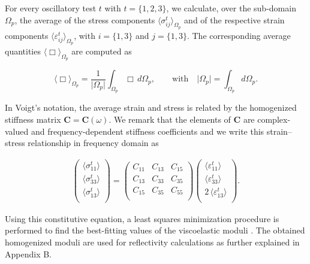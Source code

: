 \documentclass[draft]{agujournal2019}
\begin{document}
For every oscillatory test $t$ with $t = \{1,2,3\}$, we calculate, over the sub-domain $\Omega_p$, the average  of the stress components $\langle \sigma_{ij}^t \rangle_{\Omega_p}$ and of the respective strain components $\langle \varepsilon_{ij}^t \rangle_{\Omega_p}$, with $i=\{1,3\}$ and $j=\{1,3\}$. The corresponding average quantities $\langle \Box \rangle_{\Omega_p}$ are computed as
\begin{linenomath*}
\begin{equation}\label{Eq.12}
  \langle \Box \rangle_{\Omega_p} = \frac{1}{\vert \Omega_p \vert} \int_{\Omega_p} \Box \, d\Omega_p, \qquad \text{with} \quad  \vert \Omega_p \vert = \int_{\Omega_p}  d \Omega_p.
\end{equation}
\end{linenomath*}

In Voigt's notation, the average strain and stress is related by the homogenized stiffness matrix $\bm{C} = \bm{C} (\omega) $. We remark that the elements of $\bm{C}$  are  complex-valued and frequency-dependent stiffness coefficients and we write this strain--stress relationship in frequency domain as
\begin{linenomath*}
\begin{equation}\label{Eq.13}
 \begin{split}
 \begin{pmatrix}
 \langle \sigma_{11}^t\rangle \\
 \langle \sigma_{33}^t\rangle \\
  \langle\sigma_{13}^t\rangle \\
 \end{pmatrix}
 =
   \begin{pmatrix}
  C_{11} & C_{13} & C_{15} \\
  C_{13} & C_{33} & C_{35} \\
  C_{15} & C_{35} & C_{55}\\
 \end{pmatrix}
  \begin{pmatrix}
 \langle\varepsilon_{11}^t \rangle \\
 \langle \varepsilon_{33}^t \rangle \\
 2\, \langle \varepsilon_{13}^t \rangle \\
 \end{pmatrix}.
 \end{split}
\end{equation}
\end{linenomath*}
Using this constitutive equation, a least squares minimization procedure is performed to find the best-fitting values of the viscoelastic moduli \cite{Rubino2016}. The obtained homogenized moduli are used for reflectivity calculations as further explained in Appendix B.
\end{document}
